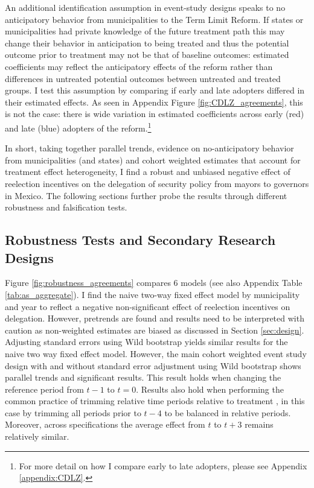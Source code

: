 An additional identification assumption in event-study designs speaks to no anticipatory behavior from municipalities to the Term Limit Reform. If states or municipalities had private knowledge of the future treatment path this may change their behavior in anticipation to being treated and thus the potential outcome prior to treatment may not be that of baseline outcomes: estimated coefficients may reflect the anticipatory effects of the reform rather than differences in untreated potential outcomes between untreated and treated groups. %
I test this assumption by comparing if early and late adopters differed in their estimated effects. As seen in Appendix Figure \ref{fig:CDLZ_agreements}, this is not the case: there is wide variation in estimated coefficients across early (red) and late (blue) adopters of the reform.\footnote{For more detail on how I compare early to late adopters, please see Appendix \ref{appendix:CDLZ}.}  

In short, taking together parallel trends, evidence on no-anticipatory behavior from municipalities (and states) and cohort weighted estimates that account for treatment effect heterogeneity, I find a robust and unbiased negative effect of reelection incentives on the delegation of security policy from mayors to governors in Mexico.  The following sections further probe the results through different robustness and falsification tests.
         

\subsection{Robustness Tests and Secondary Research Designs \label{sec:robustness}}
 
  Figure \ref{fig:robustness_agreements} compares 6 models (see also Appendix Table \ref{tab:as_aggregate}). I find the naive two-way fixed effect model by municipality and year to reflect a negative non-significant effect of reelection incentives on delegation. However, pretrends are found and results need to be interpreted with caution as non-weighted estimates are biased \citep{abraham_sun_2020} as discussed in Section \ref{sec:design}. Adjusting standard errors using Wild bootstrap yields similar results for the naive two way fixed effect model. However, the main cohort weighted event study design with and without standard error adjustment using Wild bootstrap shows parallel trends and significant results. This result holds when changing the reference period from $t-1$ to $t=0$. Results also hold when performing the common practice of trimming relative time periods relative to treatment \citep{borusyak_2017, dobkin_etal_2018}, in this case by trimming all periods prior to $t-4$ to be balanced in relative periods. Moreover, across specifications the average effect from $t$ to $t+3$ remains relatively similar. 
        
